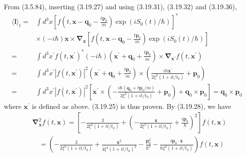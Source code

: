\documentclass{article}
\begin{document}
From (3.5.84), inserting (3.19.27) and using (3.19.31), (3.19.32) and (3.19.36),
$$
\begin{align*}
\langle\boldsymbol{l}\rangle_{t}= & \int d^{3} x\left[f\left(t, \boldsymbol{x}-\boldsymbol{q}_{0}-\frac{t \boldsymbol{p}_{0}}{m}\right) \exp \left(i S_{0}(t) / \hbar\right)\right]^{*}  \tag{3.19.38}\\
& \times(-i \hbar) \boldsymbol{x} \times \boldsymbol{\nabla}_{\boldsymbol{x}}\left[f\left(t, \boldsymbol{x}-\boldsymbol{q}_{0}-\frac{t \boldsymbol{p}_{0}}{m}\right) \exp \left(i S_{0}(t) / \hbar\right)\right] \\
= & \int d^{3} x^{\prime} f\left(t, \boldsymbol{x}^{\prime}\right)^{*}(-i \hbar)\left(\boldsymbol{x}^{\prime}+\boldsymbol{q}_{0}+\frac{t \boldsymbol{p}_{0}}{m}\right) \times \boldsymbol{\nabla}_{\boldsymbol{x}^{\prime}} f\left(t, \boldsymbol{x}^{\prime}\right) \\
= & \int d^{3} x^{\prime}\left|f\left(t, \boldsymbol{x}^{\prime}\right)\right|^{2}\left(\boldsymbol{x}^{\prime}+\boldsymbol{q}_{0}+\frac{t \boldsymbol{p}_{0}}{m}\right) \times\left(\frac{i \hbar \boldsymbol{x}^{\prime}}{2 \xi^{2}\left(1+i t / t_{0}\right)}+\boldsymbol{p}_{0}\right) \\
= & \int d^{3} x^{\prime}\left|f\left(t, \boldsymbol{x}^{\prime}\right)\right|^{2}\left[\boldsymbol{x}^{\prime} \times\left(-\frac{i \hbar\left(\boldsymbol{q}_{0}+t \boldsymbol{p}_{0} / m\right)}{2 \xi^{2}\left(1+i t / t_{0}\right)}+\boldsymbol{p}_{0}\right)+\boldsymbol{q}_{0} \times \boldsymbol{p}_{0}\right]=\boldsymbol{q}_{0} \times \boldsymbol{p}_{0}
\end{align*}
$$
where $\boldsymbol{x}^{\prime}$ is defined as above. (3.19.25) is thus proven.
By (3.19.28), we have
$$
\begin{align*}
& \boldsymbol{\nabla}_{\boldsymbol{x}}^{2} f(t, \boldsymbol{x})=\left[-\frac{3}{2 \xi^{2}\left(1+i t / t_{0}\right)}+\left(-\frac{\boldsymbol{x}}{2 \xi^{2}\left(1+i t / t_{0}\right)}+\frac{i \boldsymbol{p}_{0}}{\hbar}\right)^{2}\right] f(t, \boldsymbol{x})  \tag{3.19.39}\\
& \quad=\left(-\frac{3}{2 \xi^{2}\left(1+i t / t_{0}\right)}+\frac{\boldsymbol{x}^{2}}{4 \xi^{4}\left(1+i t / t_{0}\right)^{2}}-\frac{\boldsymbol{p}_{0}^{2}}{\hbar^{2}}-\frac{i \boldsymbol{p}_{0} \cdot \boldsymbol{x}}{\hbar \xi^{2}\left(1+i t / t_{0}\right)}\right) f(t, \boldsymbol{x})
\end{align*}
$$
\end{document}
